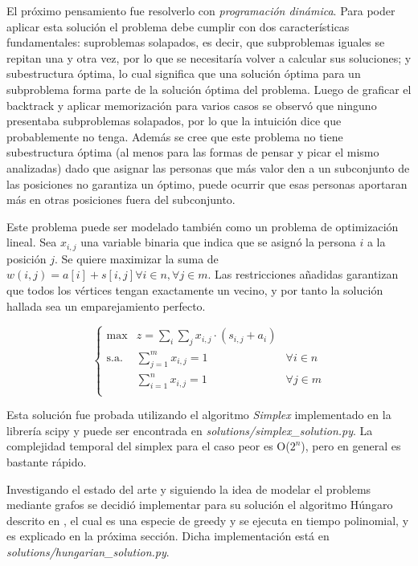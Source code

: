\documentclass[10pt]{article} %
\begin{document}
	El pr\'oximo pensamiento fue resolverlo con \textit{programaci\'on din\'amica}. Para poder aplicar esta soluci\'on el problema debe cumplir con dos caracter\'isticas fundamentales: suproblemas solapados, es decir, que subproblemas iguales se repitan una y otra vez, por lo que se necesitar\'ia volver a calcular sus soluciones; y subestructura \'optima, lo cual significa que una soluci\'on \'optima para un subproblema forma parte de la soluci\'on \'optima del problema. Luego de graficar el backtrack y aplicar memorizaci\'on para varios casos se observ\'o que ninguno presentaba subproblemas solapados, por lo que la intuici\'on dice que probablemente no tenga.
	Adem\'as se cree que este problema no tiene subestructura \'optima (al menos para las formas de pensar y picar el mismo analizadas) dado que asignar las personas que m\'as valor den a un subconjunto de las posiciones no garantiza un \'optimo, puede ocurrir que esas personas aportaran m\'as en otras posiciones fuera del subconjunto. 
	
	Este problema puede ser modelado tambi\'en como un problema de optimizaci\'on lineal. Sea $ x_{i, j} $ una variable binaria que indica que se asign\'o la persona $ i $ a la posici\'on $ j $. Se quiere maximizar la suma de $ w(i, j) = a[i] + s[i, j] \forall i \in n, \forall j \in m $. Las restricciones a\~nadidas  garantizan que todos los v\'ertices tengan exactamente un vecino, y por tanto la soluci\'on hallada sea un emparejamiento perfecto. 
	
	\begin{equation} \left\{
	\begin{matrix}
		\max & \displaystyle z=\sum_{i}\sum_{j}x_{i,j}\cdot(s_{i,j} + a_{i}) \\
		\textrm{s.a.} & \sum_{j=1}^{m} x_{i, j} = 1 & \forall i \in n \\
		& \sum_{i=1}^{n} x_{i, j} = 1 & \forall j \in m \\ 
	\end{matrix} \right. 
	\end{equation} 

	Esta soluci\'on fue probada utilizando el algoritmo \textit{Simplex} implementado en la librer\'ia scipy y puede ser encontrada en \textit{solutions/simplex\_solution.py}. La complejidad temporal del simplex para el caso peor es O($ 2^{n} $), pero en general es bastante r\'apido.
	
	Investigando el estado del arte y siguiendo la idea de modelar el problems mediante grafos se decidi\'o implementar para su soluci\'on el algoritmo H\'ungaro descrito en \cite{introduction}, el cual es una especie de greedy y se ejecuta en tiempo polinomial, y es explicado en la pr\'oxima secci\'on. Dicha implementaci\'on est\'a en \textit{solutions/hungarian\_solution.py}.
	
\end{document}
